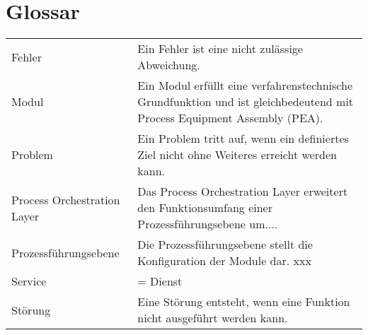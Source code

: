 \section*{Glossar}
\vspace{-0.3 cm}
\hspace{-0.3 cm}
\begin{tabular}{p{4cm}p{9cm}}
Fehler & Ein Fehler ist eine nicht zulässige Abweichung. \\
Modul & Ein Modul erfüllt eine verfahrenstechnische Grundfunktion und ist gleichbedeutend mit Process Equipment Assembly (PEA). \\
Problem & Ein Problem tritt auf, wenn ein definiertes Ziel nicht ohne Weiteres erreicht werden kann. \\
Process Orchestration Layer & Das Process Orchestration Layer erweitert den Funktionsumfang einer Prozessführungsebene um.... \\
Prozessführungsebene & Die Prozessführungsebene stellt die Konfiguration der Module dar. xxx \\
Service & = Dienst \\
Störung & Eine Störung entsteht, wenn eine Funktion nicht ausgeführt werden kann. \\
\end{tabular}
